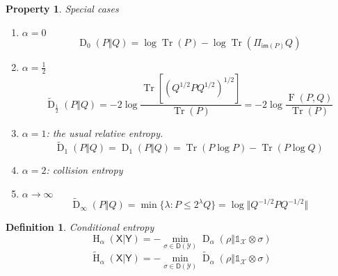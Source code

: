 \documentclass[aps,pra,onecolumn,notitlepage,superscriptaddress]{revtex4-1}
\newcommand{\reg}[1]{\mathsf{#1}}
\newcommand{\spc}[1]{\mathcal{#1}}
\newcommand{\D}{\mathsf{D}}
\newcommand{\im}{\mathsf{im}}
\newcommand{\Tr}{\operatorname{Tr}}
\newcommand{\op}[1]{\operatorname{#1}}
\newcommand\I{\mathds{1}}
\newtheorem{defi}{Definition}
\newtheorem{proper}{Property}
\begin{document}
    \begin{proper}
        Special cases
        \begin{enumerate}
            \item $\alpha = 0$
            \begin{equation}
                \op D_0(P \Vert Q) = \log \Tr(P) - \log \Tr(\Pi_{\im(P)} Q)
            \end{equation}
            \item $\alpha = \frac 1 2$
            \begin{equation}
                \widetilde{\op D}_{\frac 1 2}(P \Vert Q) = -2 \log \frac{\Tr[(Q^{1/2} P Q^{1/2})^{1/2}]}{\Tr(P)} = -2 \log \frac{\op F(P, Q)}{\Tr(P)}
            \end{equation}
            \item $\alpha = 1$: the usual relative entropy.
            \begin{equation}
                \widetilde{\op D}_1(P \Vert Q) = \op D_1(P \Vert Q) = \Tr(P \log P) - \Tr(P \log Q)
            \end{equation}
            \item $\alpha = 2$: collision entropy
            \item $\alpha \to \infty$
            \begin{equation}
                \widetilde{\op D}_{\infty}(P \Vert Q) = \min \{ \lambda : P \leq 2^\lambda Q \} = \log \Vert Q^{-1/2} P Q^{-1/2} \Vert
            \end{equation}
        \end{enumerate}
    \end{proper}

    \begin{defi}
        Conditional entropy
        \begin{equation}
            \op H_\alpha (\reg X | \reg Y) = - \min_{\sigma \in \D(\spc Y)} \op D_\alpha ( \rho \Vert \I_\spc X \otimes \sigma )
        \end{equation}
        \begin{equation}
            \widetilde{\op H}_\alpha (\reg X | \reg Y) = - \min_{\sigma \in \D(\spc Y)} \widetilde{\op D}_\alpha ( \rho \Vert \I_\spc X \otimes \sigma )
        \end{equation}
    \end{defi}
\end{document}

